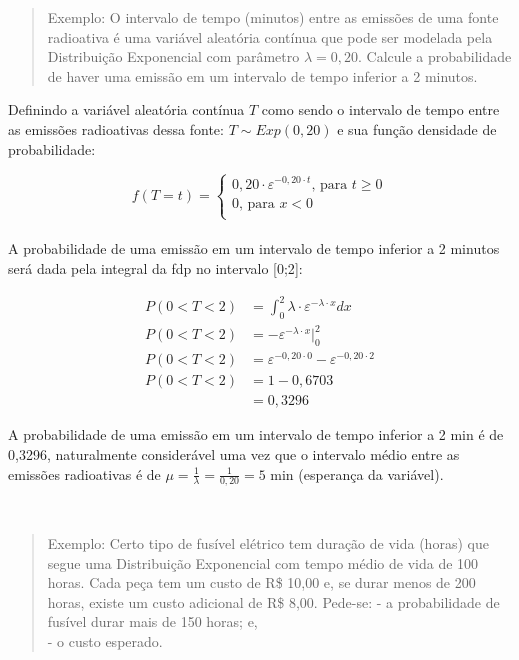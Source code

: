 \documentclass[
]{book}
\begin{document}
\hfill\break

\begin{quote}
Exemplo: O intervalo de tempo (minutos) entre as emissões de uma fonte radioativa é uma variável aleatória contínua que pode ser modelada pela Distribuição Exponencial com parâmetro \(\lambda=0,20\). Calcule a probabilidade de haver uma emissão em um intervalo de tempo inferior a 2 minutos.
\end{quote}

\hfill\break

Definindo a variável aleatória contínua \(T\) como sendo o intervalo de tempo entre as emissões radioativas dessa fonte: \(T \sim Exp (0,20)\) e sua função densidade de probabilidade:

\hfill\break

\[
f(T=t)=
\begin{cases}
    0,20 \cdot \varepsilon ^{- 0,20\cdot t} \text{, para } t \ge 0 \\
    0 \text{, para } x < 0\\
\end{cases}
\]\\

A probabilidade de uma emissão em um intervalo de tempo inferior a 2 minutos será dada pela integral da fdp no intervalo {[}0;2{]}:

\hfill\break

\begin{align*}
P( 0 < T < 2) & = \int_{0}^{2}  \lambda \cdot \varepsilon ^{- \lambda \cdot x} dx  \\ 
P( 0 < T < 2) & = - \varepsilon^{-\lambda \cdot x} \rvert_{0}^{2}  \\  
P( 0 < T < 2) & = \varepsilon^{- 0,20 \cdot 0} - \varepsilon^{- 0,20 \cdot 2} \\ 
P( 0 < T < 2) & = 1  - 0,6703 \\
              & = 0,3296
\end{align*}

\hfill\break

A probabilidade de uma emissão em um intervalo de tempo inferior a 2 min é de 0,3296, naturalmente considerável uma vez que o intervalo médio entre as emissões radioativas é de \(\mu = \frac{1}{\lambda}=\frac{1}{0,20}= 5\) min (esperança da variável).\\
\strut \\

\begin{quote}
Exemplo: Certo tipo de fusível elétrico tem duração de vida (horas) que segue uma Distribuição Exponencial com tempo médio de vida de 100 horas. Cada peça tem um custo de R\$ 10,00 e, se durar menos de 200 horas, existe um custo adicional de R\$ 8,00. Pede-se:
- a probabilidade de fusível durar mais de 150 horas; e,\\
- o custo esperado.
\end{quote}
\end{document}
